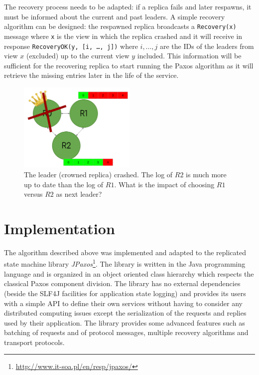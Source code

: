 \documentclass[a4paper, 10pt]{article}
\begin{document}
The recovery process needs to be adapted: if a replica fails and later respawns, it must be informed about the current and past leaders. A simple recovery algorithm can be designed: the respawned replica broadcasts a \texttt{Recovery(x)} message where \texttt{x} is the view in which the replica crashed and it will receive in response \texttt{RecoveryOK(y, [i, \dots, j])} where $i, \dots, j$ are the IDs of the leaders from view $x$ (excluded) up to the current view $y$ included. This information will be sufficient for the recovering replica to start running the Paxos algorithm as it will retrieve the missing entries later in the life of the service.
\begin{figure}[H]
  \centering
  \label{choice}
  \caption{The leader (crowned replica) crashed. The log of $R2$ is much more up to date than the log of $R1$. What is the impact of choosing $R1$ versus $R2$ as next leader? }
  \includegraphics[width=0.5\textwidth]{simplexp.png}
\end{figure}
\section{Implementation}
The algorithm described above was implemented and adapted to the replicated state machine library \textit{JPaxos}\footnote{\url{http://www.it-soa.pl/en/resp/jpaxos/}}. The library is written in the Java programming language and is organized in an object oriented class hierarchy which respects the classical Paxos component division. The library has no external dependencies (beside the SLF4J facilities for application state logging) and provides its users with a simple API to define their own services without having to consider any distributed computing issues except the serialization of the requests and replies used by their application. The library provides some advanced features such as batching of requests and of protocol messages, multiple recovery algorithms and transport protocols.
\end{document}
